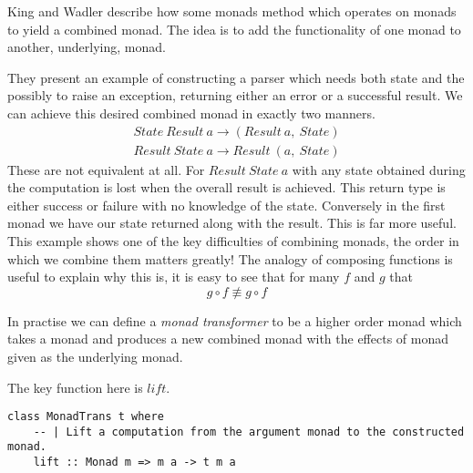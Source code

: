 King and Wadler \cite{king1993combining}
describe how some monads method which operates on monads to yield a combined monad.
The idea is to add the functionality of one monad to another, underlying, monad.

They present an example of constructing a parser which needs both state
and the possibly to raise an exception,
returning either an error or a successful result.
We can achieve this desired combined monad in exactly two manners.
\begin{align}
    State\ Result\ a \rightarrow (Result\ a,\ State)\\
    Result\ State\ a \rightarrow Result\ (a,\ State)
\end{align}
These are not equivalent at all.
For $Result\ State\ a$ with any state obtained during the computation
is lost when the overall result is achieved.
This return type is either success or failure with no knowledge of the state.
Conversely in the first monad we have our state returned along with the result.
This is far more useful.
This example shows one of the key difficulties of combining monads,
the order in which we combine them matters greatly!
The analogy of composing functions is useful to explain why this is,
it is easy to see that for many $f$ and $g$ that
\begin{equation}
    g \circ f \not\equiv g \circ f
\end{equation}

In practise we can define a \textit{monad transformer}
to be a higher order monad which takes a monad
and produces a new combined monad with the effects of
monad given as the underlying monad.

The key function here is $lift$.
\begin{verbatim}
class MonadTrans t where
    -- | Lift a computation from the argument monad to the constructed monad.
    lift :: Monad m => m a -> t m a
\end{verbatim}


